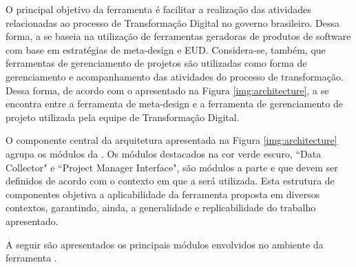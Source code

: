 O principal objetivo da ferramenta é facilitar a realização das atividades relacionadas ao processo de Transformação Digital no governo brasileiro. Dessa forma, a \itractool se baseia na utilização de ferramentas geradoras de produtos de software com base em estratégias de meta-design e EUD. Considera-se, também, que ferramentas de gerenciamento de projetos são utilizadas como forma de gerenciamento e acompanhamento das atividades do processo de transformação. Dessa forma, de acordo com o apresentado na Figura \ref{img:architecture}, a \itractool se encontra entre a ferramenta de meta-design e a ferramenta de gerenciamento de projeto utilizada pela equipe de Transformação Digital. 

O componente central da arquitetura apresentada na Figura \ref{img:architecture} agrupa os módulos da \itractool. Os módulos destacados na cor verde escuro, ``Data Collector" e ``Project Manager Interface", são módulos a parte e que devem ser definidos de acordo com o contexto em que a \itractool será utilizada. Esta estrutura de componentes objetiva a aplicabilidade da ferramenta proposta em diversos contextos, garantindo, ainda, a generalidade e replicabilidade do trabalho apresentado.

A seguir são apresentados os principais módulos envolvidos no ambiente da ferramenta \itractool.

